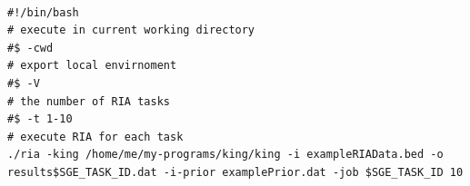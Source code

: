 \documentclass[a4paper,12pt]{article}
\begin{document}
\vspace{0.35cm} \begin{lstlisting}

#!/bin/bash
# execute in current working directory
#$ -cwd
# export local envirnoment
#$ -V
# the number of RIA tasks
#$ -t 1-10
# execute RIA for each task
./ria -king /home/me/my-programs/king/king -i exampleRIAData.bed -o results$SGE_TASK_ID.dat -i-prior examplePrior.dat -job $SGE_TASK_ID 10

\end{lstlisting} \vspace{0.35cm}





\end{document}
